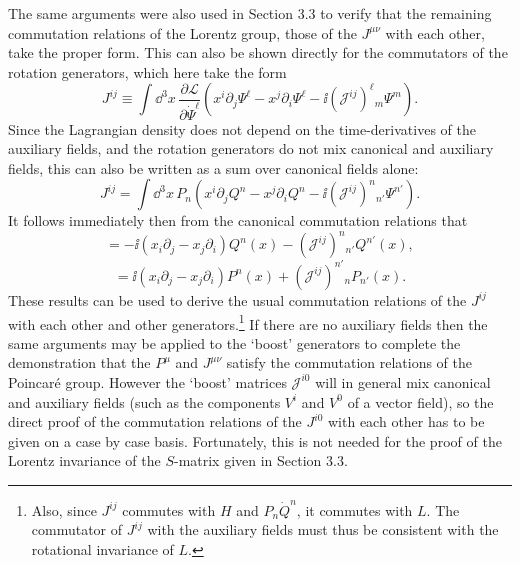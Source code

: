 The same arguments were also used in Section 3.3 to verify that the remaining
commutation relations of the Lorentz group, those of the $J^{\mu\nu}$ with each
other, take the proper form. This can also be shown directly for the
commutators of the rotation generators, which here take the form
\begin{equation}
J^{ij}\equiv\int \dd^3x\,
\frac{\partial\mathcal{L}}{\partial\dot\Psi^\ell}
\left(x^i\partial_j\Psi^\ell-x^j\partial_i\Psi^\ell
-\ii(\mathcal{J}^{ij})^\ell{}_m\Psi^m\right).
\tag{7.4.23}\label{eq:7.4.23}
\end{equation}
Since the Lagrangian density does not depend on the time-derivatives of the
auxiliary fields, and the rotation generators do not mix canonical and
auxiliary fields, this can also be written as a sum over canonical fields alone:
\begin{equation}
J^{ij}=\int \dd^3x\,P_n\left(
x^i\partial_jQ^n-x^j\partial_iQ^n
-\ii(\mathcal{J}^{ij})^n{}_{n'}\Psi^{n'}\right).
\tag{7.4.24}\label{eq:7.4.24}
\end{equation}
It follows immediately then from the canonical commutation relations that
\begin{equation}
[J^{ij},Q^n(x)]=-\ii(x_i\partial_j-x_j\partial_i)Q^n(x)
-(\mathcal{J}^{ij})^n{}_{n'}Q^{n'}(x),
\tag{7.4.25}\label{eq:7.4.25}
\end{equation}
\begin{equation}
[J^{ij},P_n(x)]=\ii(x_i\partial_j-x_j\partial_i)P^n(x)
+(\mathcal{J}^{ij})^{n'}{}_nP_{n'}(x).
\tag{7.4.26}\label{eq:7.4.26}
\end{equation}
These results can be used to derive the usual commutation relations of the
$J^{ij}$ with each other and other generators.\footnote{Also, since $J^{ij}$
commutes with $H$ and $P_n\dot Q^n$, it commutes with $L$. The commutator of
$J^{ij}$ with the auxiliary fields must thus be consistent with the rotational
invariance of $L$.} If there are no auxiliary fields then the same arguments
may be applied to the `boost' generators to complete the demonstration that the
$P^\mu$ and $J^{\mu\nu}$ satisfy the commutation relations of the Poincar\'e
group. However the `boost' matrices $\mathcal{J}^{i0}$ will in general
mix canonical and auxiliary fields (such as the components $V^i$ and $V^0$ of a
vector field), so the direct proof of the commutation relations of the
$J^{i0}$ with each other has to be given on a case by case basis. Fortunately,
this is not needed for the proof of the Lorentz invariance of the $S$-matrix
given in Section 3.3.
